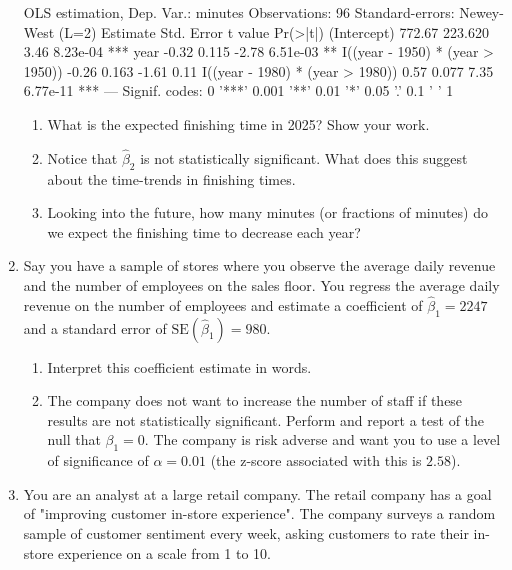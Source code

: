 \documentclass[12pt]{article}
\begin{document}
\begin{enumerate}
  \begin{codeblock}[{}]
OLS estimation, Dep. Var.: minutes
Observations: 96
Standard-errors: Newey-West (L=2)
                                  Estimate  Std. Error  t value   Pr(>|t|)
(Intercept)                         772.67     223.620     3.46   8.23e-04 ***
year                                 -0.32       0.115    -2.78   6.51e-03 **
I((year - 1950) * (year > 1950))     -0.26       0.163    -1.61   0.11
I((year - 1980) * (year > 1980))      0.57       0.077     7.35   6.77e-11 ***
---
Signif. codes:  0 '***' 0.001 '**' 0.01 '*' 0.05 '.' 0.1 ' ' 1
  \end{codeblock}

  \begin{enumerate}
    \item What is the expected finishing time in 2025? Show your work.

    \item Notice that $\hat{\beta}_2$ is not statistically significant. What does this suggest about the time-trends in finishing times.

    \item Looking into the future, how many minutes (or fractions of minutes) do we expect the finishing time to decrease each year?
  \end{enumerate}




  \vspace*{2\bigskipamount}
  \item Say you have a sample of stores where you observe the average daily revenue and the number of employees on the sales floor. You regress the average daily revenue on the number of employees and estimate a coefficient of $\hat{\beta}_1 = 2247$ and a standard error of $\text{SE}(\hat{\beta}_1) = 980$.
  \begin{enumerate}
    \item Interpret this coefficient estimate in words.

    \item The company does not want to increase the number of staff if these results are not statistically significant. Perform and report a test of the null that $\beta_1 = 0$. The company is risk adverse and want you to use a level of significance of $\alpha = 0.01$ (the z-score associated with this is $2.58$).
  \end{enumerate}



  \newpage
  \item You are an analyst at a large retail company.
  The retail company has a goal of "improving customer in-store experience".
  The company surveys a random sample of customer sentiment every week, asking customers to rate their in-store experience on a scale from 1 to 10.


\end{enumerate}
\end{document}
